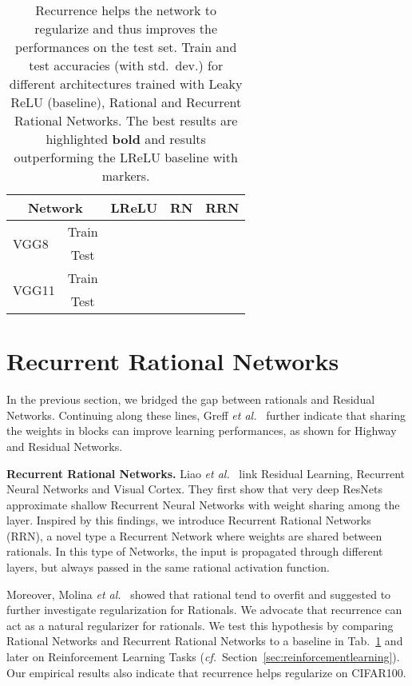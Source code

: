 \documentclass{article}
\newcommand{\cf}{\emph{cf.}~}
\newcommand{\etal}{\emph{et al.}~}
\begin{document}
\begin{table}[t]
\centering
{\def\arraystretch{1.}\tabcolsep=5.2pt
\begin{tabular}{|l|l|l|l|l|}
\hline
\multicolumn{2}{|c|}{Network}  & LReLU          & RN                    & RRN                   \\ \hline
\multirow{2}{*}{VGG8} & \multicolumn{1}{|c|}{Train}     &    &    &       \\ \cline{2-5}
& \multicolumn{1}{|c|}{Test}      &    &            &    \\ \hline
\multirow{2}{*}{VGG11} & \multicolumn{1}{|c|}{Train}     &    &    &    \\ \cline{2-5}
& \multicolumn{1}{|c|}{Test}      &    &       &    \\ \hline
\end{tabular}
}
\caption{Recurrence helps the network to regularize and thus improves the performances on the test set. Train and test accuracies (with std.~dev.) for different architectures trained with Leaky ReLU (baseline), Rational and Recurrent Rational Networks. The best results are highlighted \textbf{bold} and results outperforming the LReLU baseline with  markers.\label{tab:cifars_all_archs}}
\end{table}



\section{Recurrent Rational Networks}
In the previous section, we bridged the gap between rationals and Residual Networks. Continuing along these lines, Greff \etal{} further indicate that sharing the weights in blocks can improve learning performances, as shown for Highway \cite{lu2016small} and Residual \cite{liao2016bridging} Networks. 

\textbf{Recurrent Rational Networks.}
Liao \etal{} link Residual Learning, Recurrent Neural Networks and Visual Cortex. They first show that very deep ResNets approximate shallow Recurrent Neural Networks with weight sharing among the layer. Inspired by this findings, we introduce Recurrent Rational Networks (RRN), a novel type a Recurrent Network where weights are shared between rationals. In this type of Networks, the input is propagated through different layers, but always passed in the same rational activation function.

Moreover, Molina \etal{} showed that rational tend to overfit and suggested to further investigate regularization for Rationals. We advocate that recurrence can act as a natural regularizer for rationals. We test this hypothesis by comparing Rational Networks and Recurrent Rational Networks to a baseline in Tab.~\ref{tab:cifars_all_archs} and later on Reinforcement Learning Tasks (\cf Section~\ref{sec:reinforcementlearning}). Our empirical results also indicate that recurrence helps regularize on CIFAR100.
\end{document}
